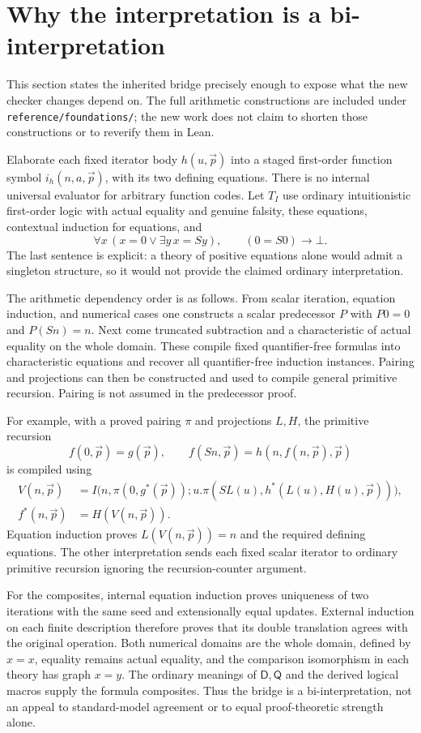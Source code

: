 \documentclass[11pt]{article}
\theoremstyle{definition}
\theoremstyle{remark}
\newcommand{\D}{\mathsf D}
\newcommand{\Q}{\mathsf Q}
\begin{document}
\section{Why the interpretation is a bi-interpretation}
\label{sec:bridge}

This section states the inherited bridge precisely enough to expose what
the new checker changes depend on.  The full arithmetic constructions are
included under \texttt{reference/foundations/}; the new work does not claim
to shorten those constructions or to reverify them in Lean.

Elaborate each fixed iterator body $h(u,\vec p)$ into a staged first-order
function symbol $i_h(n,a,\vec p)$, with its two defining equations.
There is no internal universal evaluator for arbitrary function codes.
Let $T_I$ use ordinary intuitionistic first-order logic with actual equality
and genuine falsity, these equations, contextual induction for equations,
and
\[
 \forall x\,(x=0\vee\exists y\,x=Sy),
 \qquad (0=S0)\to\bot.
\]
The last sentence is explicit: a theory of positive equations alone would
admit a singleton structure, so it would not provide the claimed ordinary
interpretation.

The arithmetic dependency order is as follows.  From scalar iteration,
equation induction, and numerical cases one constructs a scalar predecessor
$P$ with $P0=0$ and $P(Sn)=n$.  Next come truncated subtraction and a
characteristic of actual equality on the whole domain.  These compile fixed
quantifier-free formulas into characteristic equations and recover all
quantifier-free induction instances.  Pairing and projections can then be
constructed and used to compile general primitive recursion.  Pairing is
not assumed in the predecessor proof.

For example, with a proved pairing $\pi$ and projections $L,H$, the
primitive recursion
\[
 f(0,\vec p)=g(\vec p),\qquad
 f(Sn,\vec p)=h(n,f(n,\vec p),\vec p)
\]
is compiled using
\begin{align*}
 V(n,\vec p)&=I\bigl(n,\pi(0,g^*(\vec p));
     u.\pi(SL(u),h^*(L(u),H(u),\vec p))\bigr),\\
 f^*(n,\vec p)&=H(V(n,\vec p)).
\end{align*}
Equation induction proves $L(V(n,\vec p))=n$ and the required defining
equations.  The other interpretation sends each fixed scalar iterator to
ordinary primitive recursion ignoring the recursion-counter argument.

For the composites, internal equation induction proves uniqueness of two
iterations with the same seed and extensionally equal updates.  External
induction on each finite description therefore proves that its double
translation agrees with the original operation.  Both numerical domains
are the whole domain, defined by $x=x$, equality remains actual equality,
and the comparison isomorphism in each theory has graph $x=y$.  The
ordinary meanings of $\D,\Q$ and the derived logical macros supply the
formula composites.  Thus the bridge is a bi-interpretation, not an appeal
to standard-model agreement or to equal proof-theoretic strength alone.
\end{document}
